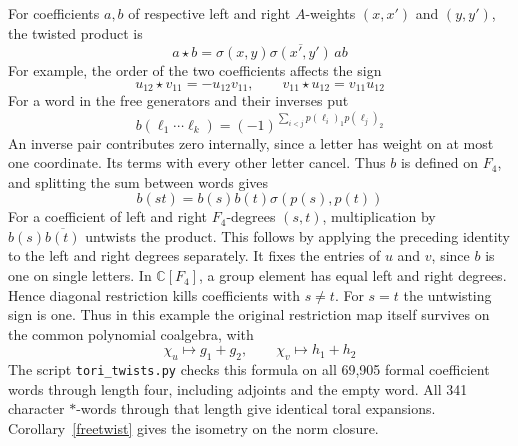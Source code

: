 \documentclass[11pt,a4paper]{article}
\theoremstyle{remark}
\begin{document}
For coefficients $a,b$ of respective left and right $A$-weights
$(x,x')$ and $(y,y')$, the twisted product is
\[
 a\star b=\sigma(x,y)\overline{\sigma(x',y')}\,ab
\]
For example, the order of the two coefficients affects the sign
\[
 u_{12}\star v_{11}=-u_{12}v_{11},\qquad
 v_{11}\star u_{12}=v_{11}u_{12}
\]
For a word in the free generators and their inverses put
\[
 b(\ell_1\cdots\ell_k)=
 (-1)^{\displaystyle\sum_{i<j}p(\ell_i)_1p(\ell_j)_2}
\]
An inverse pair contributes zero internally, since a letter has weight
on at most one coordinate. Its terms with every other letter cancel.
Thus $b$ is defined on $F_4$, and splitting the sum between words gives
\[
 b(st)=b(s)b(t)\sigma(p(s),p(t))
\]
For a coefficient of left and right $F_4$-degrees $(s,t)$, multiplication
by $b(s)\overline{b(t)}$ untwists the product. This follows by
applying the preceding identity to the left and right degrees separately. It fixes the
entries of $u$ and $v$, since $b$ is one on single letters.
In $\mathbb C[F_4]$, a group element has equal left and right degrees.
Hence diagonal restriction kills coefficients with $s\ne t$. For
$s=t$ the untwisting sign is one. Thus in this example the original restriction
map itself survives on the common polynomial coalgebra, with
\[
 \chi_u\longmapsto g_1+g_2,\qquad \chi_v\longmapsto h_1+h_2
\]
The script \texttt{tori\_twists.py} checks this formula on all 69,905
formal coefficient words through length four, including adjoints and
the empty word. All 341 character $*$-words through that length give
identical toral expansions. Corollary~\ref{freetwist} gives the isometry
on the norm closure.
\end{document}
